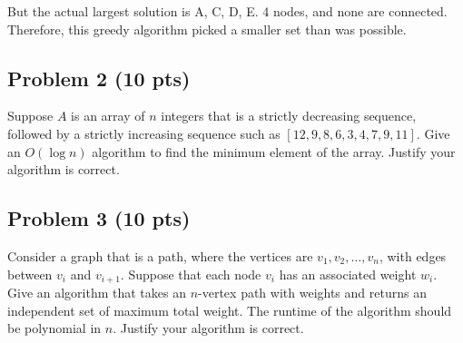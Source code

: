 \documentclass[12pt]{article}
\begin{document}
But the actual largest solution is {A, C, D, E}. 4 nodes, and none are connected.
Therefore, this greedy algorithm picked a smaller set than was possible.

\subsection*{Problem 2 (10 pts)}
Suppose $A$ is an array of $n$ integers that is a strictly decreasing sequence, followed by a strictly increasing sequence such as $[12, 9, 8, 6, 3, 4, 7, 9, 11]$. Give an $O(\log n)$ algorithm to find the minimum element of the array. Justify your algorithm is correct.

\subsection*{Problem 3 (10 pts)}
Consider a graph that is a path, where the vertices are $v_1, v_2, \ldots, v_n$, with edges between $v_i$ and $v_{i+1}$. Suppose that each node $v_i$ has an associated weight $w_i$. Give an algorithm that takes an $n$-vertex path with weights and returns an independent set of maximum total weight. The runtime of the algorithm should be polynomial in $n$. Justify your algorithm is correct.
\end{document}
